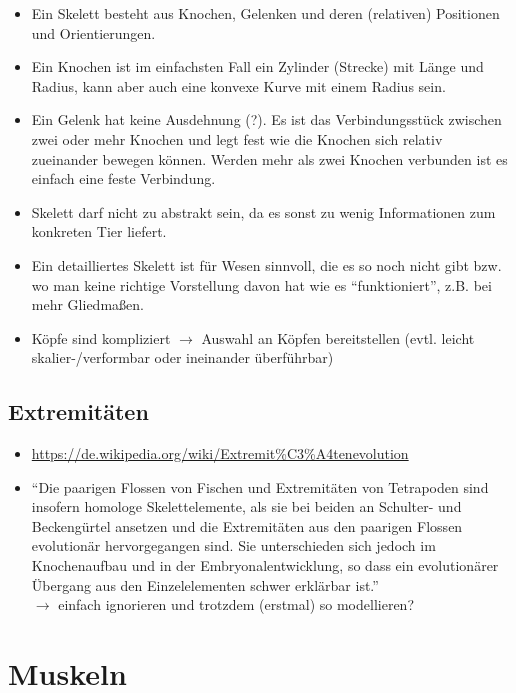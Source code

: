 \begin{itemize}
 \item Ein Skelett besteht aus Knochen, Gelenken und deren (relativen) Positionen und Orientierungen.
 \item Ein Knochen ist im einfachsten Fall ein Zylinder (Strecke) mit Länge und Radius, kann aber auch eine konvexe Kurve mit einem Radius sein.
 \item Ein Gelenk hat keine Ausdehnung (?). Es ist das Verbindungsstück zwischen zwei oder mehr Knochen und legt fest wie die Knochen sich relativ zueinander bewegen können. Werden mehr als zwei Knochen verbunden ist es einfach eine feste Verbindung.
 \item Skelett darf nicht zu abstrakt sein, da es sonst zu wenig Informationen zum konkreten Tier liefert.
 \item Ein detailliertes Skelett ist für Wesen sinnvoll, die es so noch nicht gibt bzw. wo man keine richtige Vorstellung davon hat wie es "`funktioniert"', z.B. bei mehr Gliedmaßen.
 \item Köpfe sind kompliziert $\rightarrow$ Auswahl an Köpfen bereitstellen (evtl. leicht skalier-/verformbar oder ineinander überführbar)
\end{itemize}

\subsection{Extremitäten}

\begin{itemize}
 \item \url{https://de.wikipedia.org/wiki/Extremit\%C3\%A4tenevolution}
 \item "`Die paarigen Flossen von Fischen und Extremitäten von Tetrapoden sind insofern homologe Skelettelemente, als sie bei beiden an Schulter- und Beckengürtel ansetzen und die Extremitäten aus den paarigen Flossen evolutionär hervorgegangen sind.\cite{homology} Sie unterschieden sich jedoch im Knochenaufbau und in der Embryonalentwicklung, so dass ein evolutionärer Übergang aus den Einzelelementen schwer erklärbar ist."'\\
 $\rightarrow$ einfach ignorieren und trotzdem (erstmal) so modellieren?
\end{itemize}


\section{Muskeln}

